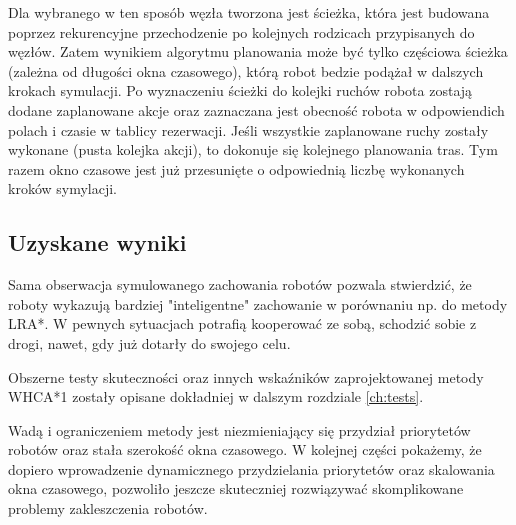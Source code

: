 Dla wybranego w ten sposób węzła tworzona jest ścieżka, która jest budowana poprzez rekurencyjne przechodzenie po kolejnych rodzicach przypisanych do węzłów.
Zatem wynikiem algorytmu planowania może być tylko częściowa ścieżka (zależna od długości okna czasowego), którą robot bedzie podążał w dalszych krokach symulacji.
Po wyznaczeniu ścieżki do kolejki ruchów robota zostają dodane zaplanowane akcje oraz zaznaczana jest obecność robota w odpowiendich polach i czasie w tablicy rezerwacji.
Jeśli wszystkie zaplanowane ruchy zostały wykonane (pusta kolejka akcji), to dokonuje się kolejnego planowania tras.
Tym razem okno czasowe jest już przesunięte o odpowiednią liczbę wykonanych kroków symylacji.

\subsection{Uzyskane wyniki}
Sama obserwacja symulowanego zachowania robotów pozwala stwierdzić, że roboty wykazują bardziej "inteligentne" zachowanie w porównaniu np. do metody LRA*. W pewnych sytuacjach potrafią kooperować ze sobą, schodzić sobie z drogi, nawet, gdy już dotarły do swojego celu.

Obszerne testy skuteczności oraz innych wskaźników zaprojektowanej metody WHCA*1 zostały opisane dokładniej w dalszym rozdziale \ref{ch:tests}.

Wadą i ograniczeniem metody jest niezmieniający się przydział priorytetów robotów oraz stała szerokość okna czasowego.
W kolejnej części pokażemy, że dopiero wprowadzenie dynamicznego przydzielania priorytetów oraz skalowania okna czasowego, pozwoliło jeszcze skuteczniej rozwiązywać skomplikowane problemy zakleszczenia robotów.
